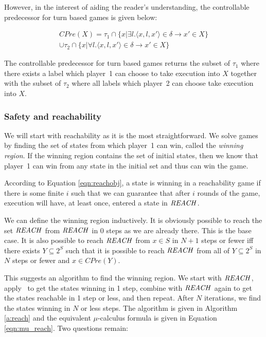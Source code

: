 However, in the interest of aiding the reader's understanding, the controllable predecessor for turn based games is given below:

\begin{multline}
CPre(X) = \tau_1 \cap \{x | \exists l. \langle x, l, x' \rangle \in \delta \rightarrow x' \in X\} \\ \cup \tau_2 \cap \{x | \forall l. \langle x, l, x' \rangle \in \delta \rightarrow x' \in X \}
\end{multline}

The controllable predecessor for turn based games returns the subset of $\tau_1$ where there exists a label which player~1 can choose to take execution into $X$ together with the subset of $\tau_2$ where all labels which player~2 can choose take execution into $X$. 

\subsubsection{Safety and reachability}

We will start with reachability as it is the most straightforward. We solve games by finding the set of states from which player~1 can win, called the \emph{winning region}. If the winning region contains the set of initial states, then we know that player~1 can win from any state in the initial set and thus can win the game.

According to Equation \ref{eqn:reachobj}, a state is winning in a reachability game if there is some finite $i$ such that we can guarantee that after $i$ rounds of the game, execution will have, at least once, entered a state in $\mathit{REACH}$. 

We can define the winning region inductively. It is obviously possible to reach the set $\mathit{REACH}$ from $\mathit{REACH}$ in 0 steps as we are already there. This is the base case. It is also possible to reach $\mathit{REACH}$ from $x \in S$ in $N + 1$ steps or fewer iff there exists $Y\subseteq 2^S$ such that it is possible to reach $\mathit{REACH}$ from all of $Y \subseteq 2^S$ in $N$ steps or fewer and $x \in CPre(Y)$.

This suggests an algorithm to find the winning region. We start with $\mathit{REACH}$, apply \cpre\ to get the states winning in 1 step, combine with $\mathit{REACH}$ again to get the states reachable in 1 step or less, and then repeat. After $N$ iterations, we find the states winning in $N$ or less steps. The algorithm is given in Algorithm \ref{a:reach} and the equivalent $\mu$-calculus formula is given in Equation \ref{eqn:mu_reach}. Two questions remain: 

